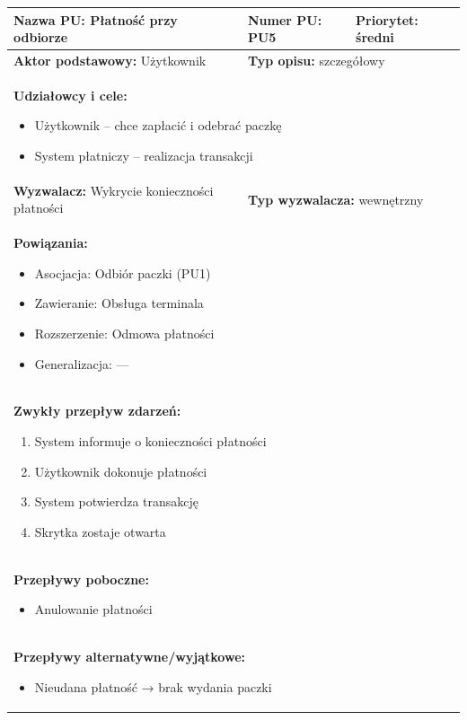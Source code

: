\documentclass[a4paper,12pt]{article}
\begin{document}
\begin{tabular}{|p{6cm}|p{4cm}|p{5cm}|}
\hline
\textbf{Nazwa PU:} Płatność przy odbiorze &
\textbf{Numer PU:} PU5 &
\textbf{Priorytet:} średni \\
\hline
\textbf{Aktor podstawowy:} Użytkownik &
\multicolumn{2}{p{9cm}|}{\textbf{Typ opisu:} szczegółowy} \\
\hline
\multicolumn{3}{|p{15cm}|}{
\textbf{Udziałowcy i cele:}
\begin{itemize}
\item Użytkownik – chce zapłacić i odebrać paczkę
\item System płatniczy – realizacja transakcji
\end{itemize}
} \\
\hline
\textbf{Wyzwalacz:} Wykrycie konieczności płatności &
\multicolumn{2}{p{9cm}|}{\textbf{Typ wyzwalacza:} wewnętrzny} \\
\hline
\multicolumn{3}{|p{15cm}|}{
\textbf{Powiązania:}
\begin{itemize}
\item Asocjacja: Odbiór paczki (PU1)
\item Zawieranie: Obsługa terminala
\item Rozszerzenie: Odmowa płatności
\item Generalizacja: —
\end{itemize}
} \\
\hline
\multicolumn{3}{|p{15cm}|}{
\textbf{Zwykły przepływ zdarzeń:}
\begin{enumerate}
\item System informuje o konieczności płatności
\item Użytkownik dokonuje płatności
\item System potwierdza transakcję
\item Skrytka zostaje otwarta
\end{enumerate}
} \\
\hline
\multicolumn{3}{|p{15cm}|}{
\textbf{Przepływy poboczne:}
\begin{itemize}
\item Anulowanie płatności
\end{itemize}
} \\
\hline
\multicolumn{3}{|p{15cm}|}{
\textbf{Przepływy alternatywne/wyjątkowe:}
\begin{itemize}
\item Nieudana płatność → brak wydania paczki
\end{itemize}
} \\
\hline
\end{tabular}
\end{document}
